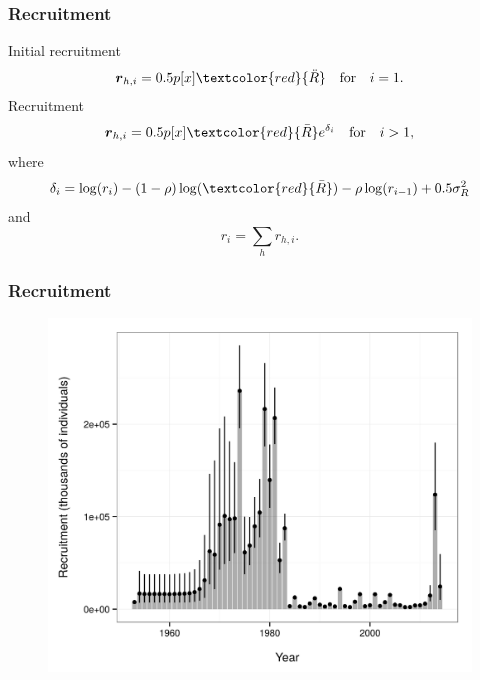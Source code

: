 \documentclass{beamer}
\begin{document}

\begin{frame}
\frametitle{Recruitment}
Initial recruitment
\begin{equation*}
  \boldsymbol{r}_{h,i} = 0.5 p[x] \textcolor{red}{\ddot{R}} \quad \text{for} \quad i=1.
\end{equation*}
Recruitment
\begin{equation*}
  \boldsymbol{r}_{h,i} = 0.5 p[x] \textcolor{red}{\bar{R}} e^{\delta_i}  \quad \text{for} \quad i>1,
\end{equation*}
where
\begin{equation*}
  \delta_i = \log (r_i) - (1-\rho) \log (\textcolor{red}{\bar{R}}) - \rho \log(r_{i-1}) + 0.5 \sigma^2_R
\end{equation*}
and
\begin{equation*}
  r_i = \sum_h r_{h,i}.
\end{equation*}
\end{frame}


\begin{frame}
\frametitle{Recruitment}
\begin{figure}[!htbp]
  \centering
  \includegraphics[width=0.75\linewidth]{../../examples/bbrkc/OneSex/figure/recruitment.png}
\end{figure}
\end{frame}

\end{document}
